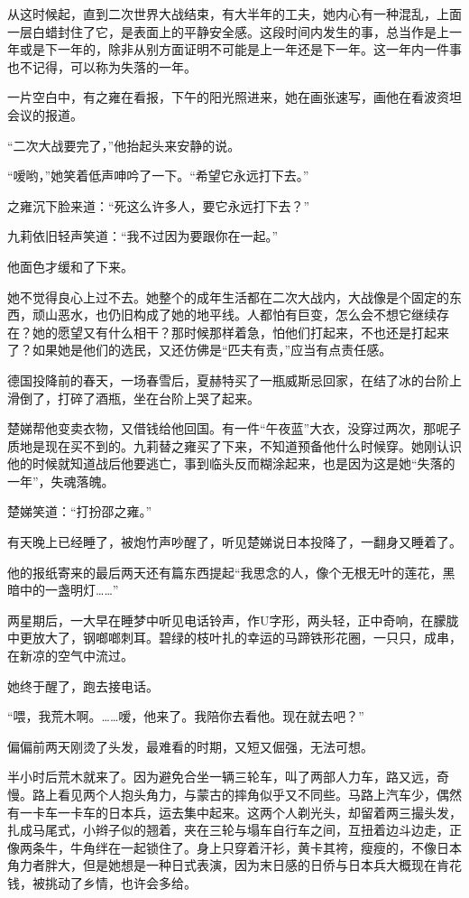 \par 从这时候起，直到二次世界大战结束，有大半年的工夫，她内心有一种混乱，上面一层白蜡封住了它，是表面上的平静安全感。这段时间内发生的事，总当作是上一年或是下一年的，除非从别方面证明不可能是上一年还是下一年。这一年内一件事也不记得，可以称为失落的一年。
\par 一片空白中，有之雍在看报，下午的阳光照进来，她在画张速写，画他在看波资坦会议的报道。
\par “二次大战要完了，”他抬起头来安静的说。
\par “嗳哟，”她笑着低声呻吟了一下。“希望它永远打下去。”
\par 之雍沉下脸来道：“死这么许多人，要它永远打下去？”
\par 九莉依旧轻声笑道：“我不过因为要跟你在一起。”
\par 他面色才缓和了下来。
\par 她不觉得良心上过不去。她整个的成年生活都在二次大战内，大战像是个固定的东西，顽山恶水，也仍旧构成了她的地平线。人都怕有巨变，怎么会不想它继续存在？她的愿望又有什么相干？那时候那样着急，怕他们打起来，不也还是打起来了？如果她是他们的选民，又还仿佛是“匹夫有责，”应当有点责任感。
\par 德国投降前的春天，一场春雪后，夏赫特买了一瓶威斯忌回家，在结了冰的台阶上滑倒了，打碎了酒瓶，坐在台阶上哭了起来。
\par 楚娣帮他变卖衣物，又借钱给他回国。有一件“午夜蓝”大衣，没穿过两次，那呢子质地是现在买不到的。九莉替之雍买了下来，不知道预备他什么时候穿。她刚认识他的时候就知道战后他要逃亡，事到临头反而糊涂起来，也是因为这是她“失落的一年”，失魂落魄。
\par 楚娣笑道：“打扮邵之雍。”
\par 有天晚上已经睡了，被炮竹声吵醒了，听见楚娣说日本投降了，一翻身又睡着了。
\par 他的报纸寄来的最后两天还有篇东西提起“我思念的人，像个无根无叶的莲花，黑暗中的一盏明灯……”
\par 两星期后，一大早在睡梦中听见电话铃声，作U字形，两头轻，正中奇响，在朦胧中更放大了，钢啷啷刺耳。碧绿的枝叶扎的幸运的马蹄铁形花圈，一只只，成串，在新凉的空气中流过。
\par 她终于醒了，跑去接电话。
\par “喂，我荒木啊。……嗳，他来了。我陪你去看他。现在就去吧？”
\par 偏偏前两天刚烫了头发，最难看的时期，又短又倔强，无法可想。
\par 半小时后荒木就来了。因为避免合坐一辆三轮车，叫了两部人力车，路又远，奇慢。路上看见两个人抱头角力，与蒙古的摔角似乎又不同些。马路上汽车少，偶然有一卡车一卡车的日本兵，运去集中起来。这两个人剃光头，却留着两三撮头发，扎成马尾式，小辫子似的翘着，夹在三轮与塌车自行车之间，互扭着边斗边走，正像两条牛，牛角绊在一起锁住了。身上只穿着汗衫，黄卡其袴，瘦瘦的，不像日本角力者胖大，但是她想是一种日式表演，因为末日感的日侨与日本兵大概现在肯花钱，被挑动了乡情，也许会多给。

